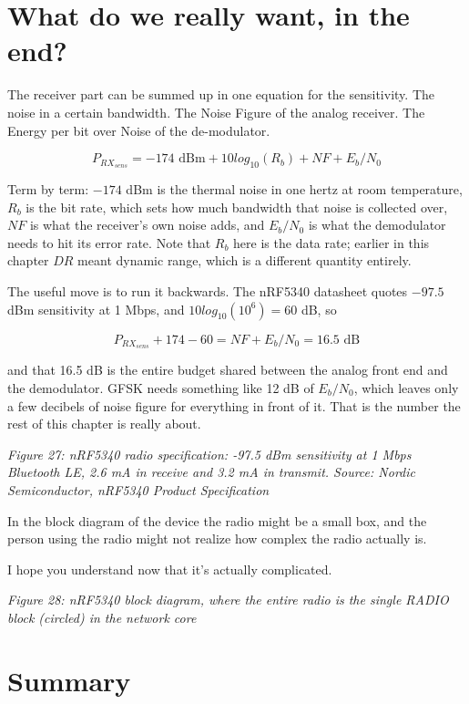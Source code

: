 \section{What do we really want, in the
end?}\label{what-do-we-really-want-in-the-end}

The receiver part can be summed up in one equation for the sensitivity.
The noise in a certain bandwidth. The Noise Figure of the analog
receiver. The Energy per bit over Noise of the de-modulator.

\[P_{RX_{sens}} = -174 \text{ dBm} + 10 log_{10}(R_b)  + NF + E_b/N_0\]

Term by term: \(-174\) dBm is the thermal noise in one hertz at room
temperature, \(R_b\) is the bit rate, which sets how much bandwidth that
noise is collected over, \(NF\) is what the receiver's own noise adds,
and \(E_b/N_0\) is what the demodulator needs to hit its error rate.
Note that \(R_b\) here is the data rate; earlier in this chapter \(DR\)
meant dynamic range, which is a different quantity entirely.

The useful move is to run it backwards. The nRF5340 datasheet quotes
\(-97.5\) dBm sensitivity at 1 Mbps, and \(10log_{10}(10^6) = 60\) dB,
so

\[ P_{RX_{sens}} + 174 - 60 =  NF + E_b/N_0 = 16.5 \text{ dB}\]

and that 16.5 dB is the entire budget shared between the analog front
end and the demodulator. GFSK needs something like 12 dB of \(E_b/N_0\),
which leaves only a few decibels of noise figure for everything in front
of it. That is the number the rest of this chapter is really about.


{
\centering
{}
}

\emph{Figure 27: nRF5340 radio specification: -97.5 dBm sensitivity at 1
Mbps Bluetooth LE, 2.6 mA in receive and 3.2 mA in transmit. Source:
Nordic Semiconductor, nRF5340 Product Specification}

In the block diagram of the device the radio might be a small box, and
the person using the radio might not realize how complex the radio
actually is.

I hope you understand now that it's actually complicated.


{
\centering
{}
}

\emph{Figure 28: nRF5340 block diagram, where the entire radio is the
single RADIO block (circled) in the network core}

\section{Summary}\label{summary}

